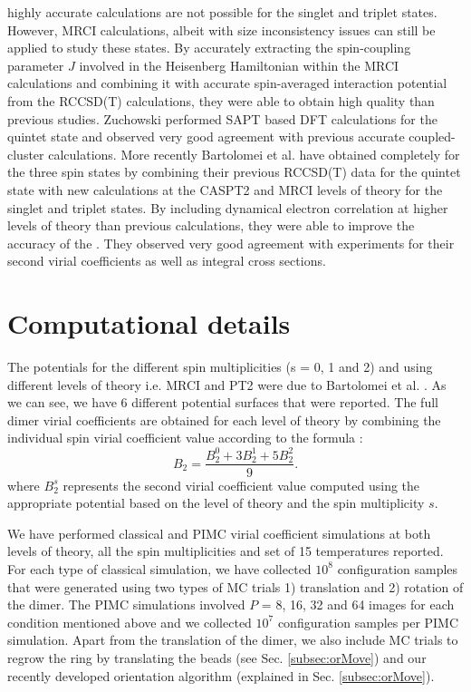 highly accurate calculations are not possible for the singlet and triplet states. However, MRCI calculations, albeit with size inconsistency issues can still be applied to study these states. By accurately extracting the spin-coupling parameter $J$ involved in the Heisenberg Hamiltonian within the MRCI calculations and combining it with accurate spin-averaged interaction potential from the RCCSD(T) calculations, they were able to obtain high quality \PESs{} than previous studies. Zuchowski \cite{Zuchowski2008} performed SAPT based DFT calculations for the quintet state and observed very good agreement with previous accurate \abinitio{} coupled-cluster calculations. More recently Bartolomei et al. \cite{Bartolomei2010} have obtained completely \abinitio{} \PESs{} for the three spin states by combining their previous RCCSD(T) data \cite{Bartolomei2008} for the quintet state with new \abinitio{} calculations at the CASPT2 and MRCI levels of theory for the singlet and triplet states. By including dynamical electron correlation at higher levels of theory than previous calculations, they were able to improve the accuracy of the \PESs{}. They observed very good agreement with experiments for their second virial coefficients as well as integral cross sections.
\section{Computational details}
    The \abinitio{} potentials for the different spin multiplicities (s = 0, 1 and 2) and using different levels of theory i.e. MRCI and PT2 were due to Bartolomei et al. \cite{Bartolomei2010}. As we can see, we have 6 different potential surfaces that were reported. The full dimer virial coefficients are obtained for each level of theory by combining the individual spin virial coefficient value according to the formula \cite{Aquilanti1999,Bartolomei2010}:
    \begin{equation}
        \label{eq:o2combination}
        B_2 = \frac{B_2^0 + 3 B_2^1 + 5 B_2^2}{9}.
    \end{equation}
    where $B_2^s$ represents the second virial coefficient value computed using the appropriate potential based on the level of theory and the spin multiplicity $s$.

    We have performed classical and PIMC virial coefficient simulations at both levels of theory, all the spin multiplicities and set of 15 temperatures reported. For each type of classical simulation, we have collected $10^8$ configuration samples that were generated using two types of MC trials 1) translation and 2) rotation of the dimer. The PIMC simulations involved $P$ = 8, 16, 32 and 64 images for each condition mentioned above and we collected $10^7$ configuration samples per PIMC simulation. Apart from the translation of the dimer, we also include MC trials to regrow the ring by translating the beads (see Sec. \ref{subsec:orMove}) and our recently developed orientation algorithm \cite{hydrogen} (explained in Sec. \ref{subsec:orMove}).

